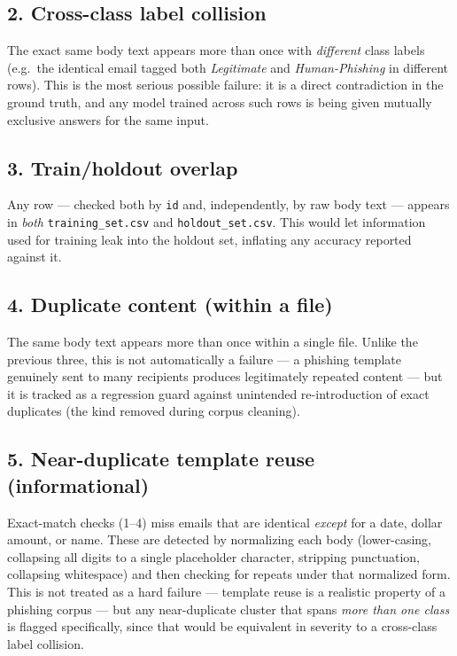 \documentclass[11pt]{article}
\begin{document}
\subsection*{2. Cross-class label collision}
The exact same body text appears more than once with \emph{different} class labels (e.g.\ the identical
email tagged both \textit{Legitimate} and \textit{Human-Phishing} in different rows). This is the most
serious possible failure: it is a direct contradiction in the ground truth, and any model trained across
such rows is being given mutually exclusive answers for the same input.

\subsection*{3. Train/holdout overlap}
Any row --- checked both by \texttt{id} and, independently, by raw body text --- appears in \emph{both}
\texttt{training\_set.csv} and \texttt{holdout\_set.csv}. This would let information used for training
leak into the holdout set, inflating any accuracy reported against it.

\subsection*{4. Duplicate content (within a file)}
The same body text appears more than once within a single file. Unlike the previous three, this is not
automatically a failure --- a phishing template genuinely sent to many recipients produces legitimately
repeated content --- but it is tracked as a regression guard against unintended re-introduction of exact
duplicates (the kind removed during corpus cleaning).

\subsection*{5. Near-duplicate template reuse (informational)}
Exact-match checks (1--4) miss emails that are identical \emph{except} for a date, dollar amount, or
name. These are detected by normalizing each body (lower-casing, collapsing all digits to a single
placeholder character, stripping punctuation, collapsing whitespace) and then checking for repeats under
that normalized form. This is not treated as a hard failure --- template reuse is a realistic property of
a phishing corpus --- but any near-duplicate cluster that spans \emph{more than one class} is flagged
specifically, since that would be equivalent in severity to a cross-class label collision.
\end{document}
